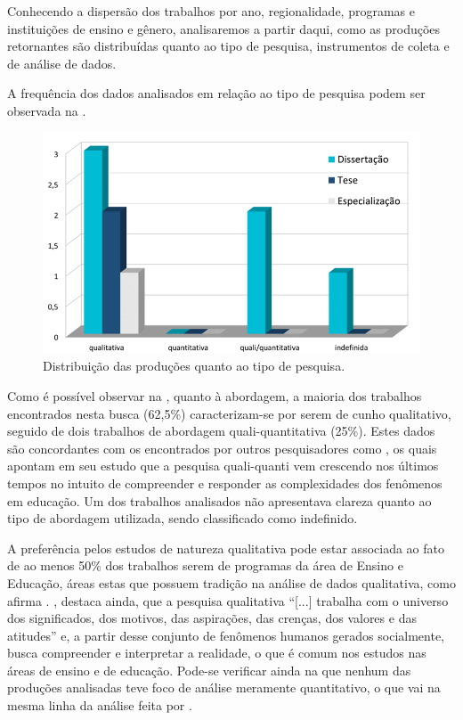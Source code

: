 Conhecendo a dispersão dos trabalhos por ano, regionalidade, programas e
instituições de ensino e gênero, analisaremos a partir daqui, como as
produções retornantes são distribuídas quanto ao tipo de pesquisa,
instrumentos de coleta e de análise de dados. 

A frequência dos dados analisados em relação ao tipo de pesquisa podem
ser observada na .

\begin{figure}[!htpb]
\centering
\begin{minipage}{.5\textwidth}
\caption{Distribuição das produções quanto ao tipo de pesquisa.}\label{fig5}
\includegraphics[width=\textwidth]{Fig5.png}
\end{minipage}
\end{figure}

Como é possível observar na , quanto à abordagem, a maioria dos
trabalhos encontrados nesta busca (62,5\%) caracterizam-se por serem de
cunho qualitativo, seguido de dois trabalhos de abordagem
quali-quantitativa (25\%). Estes dados são concordantes com os
encontrados por outros pesquisadores como \textcite{minuzzi2020}, os
quais apontam em seu estudo que a pesquisa quali-quanti vem crescendo
nos últimos tempos no intuito de compreender e responder as
complexidades dos fenômenos em educação. Um dos trabalhos analisados não
apresentava clareza quanto ao tipo de abordagem utilizada, sendo
classificado como indefinido.

A preferência pelos estudos de natureza qualitativa pode estar associada
ao fato de ao menos 50\% dos trabalhos serem de programas da área de
Ensino e Educação, áreas estas que possuem tradição na análise de dados
qualitativa, como afirma \textcite{Teixeira_2015}. \textcite[p. 24]{Minayo2007}, destaca
ainda, que a pesquisa qualitativa ``[...] trabalha com o universo
dos significados, dos motivos, das aspirações, das crenças, dos valores
e das atitudes'' e, a partir desse conjunto de fenômenos humanos gerados
socialmente, busca compreender e interpretar a realidade, o que é comum
nos estudos nas áreas de ensino e de educação. Pode-se verificar ainda
na  que nenhum das produções analisadas teve foco de análise
meramente quantitativo, o que vai na mesma linha da análise feita por
\textcite{Teixeira_2015}.

